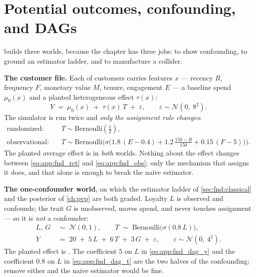 \section{Potential outcomes, confounding, and DAGs}
\label{app:dgp:fnd}

 builds three worlds, because the chapter has three jobs: to show confounding,
to ground an estimator ladder, and to manufacture a collider.

\textbf{The customer file.} Each of \nbZeroNCustomers{} customers carries features $x$ ---
recency $R$, frequency $F$, monetary value $M$, tenure, engagement $E$ --- a baseline spend
$\mu_0(x)$ and a planted heterogeneous effect $\tau(x)$:
%
\begin{equation}
  Y \;=\; \mu_0(x) \;+\; \tau(x)\,T \;+\; \varepsilon,
  \qquad \varepsilon \sim \mathcal N\!\left(0,\ 8^{2}\right).
  \label{eq:app:fnd_uplift}
\end{equation}
%
The simulator is run twice and \emph{only the assignment rule changes}:
%
\begin{align}
  \text{randomized:}\quad    & T \sim \text{Bernoulli}(\tfrac12), \label{eq:app:fnd_rct}\\
  \text{observational:}\quad & T \sim \text{Bernoulli}\Big(\sigma\big(1.8\,(E - 0.4)
     + 1.2\,\tfrac{150 - R}{150} + 0.15\,(F - 5)\big)\Big). \label{eq:app:fnd_obs}
\end{align}
%
The planted average effect is \eur{\nbZeroTrueAte} in \emph{both} worlds. Nothing about the effect
changes between \cref{eq:app:fnd_rct} and \cref{eq:app:fnd_obs}; only the mechanism that assigns it
does, and that alone is enough to break the naive estimator.

\textbf{The one-confounder world}, on which the estimator ladder of \cref{sec:fnd:classical} and
the posterior of \cref{ch:pvp} are both graded. Loyalty $L$ is observed and confounds; the trait
$G$ is unobserved, moves spend, and never touches assignment --- so it is \emph{not} a confounder:
%
\begin{align}
  L,\ G &\;\sim\; \mathcal N(0, 1), \qquad
  T \;\sim\; \text{Bernoulli}\big(\sigma(0.8\,L)\big), \label{eq:app:fnd_dag_t}\\
  Y &\;=\; 20 \;+\; 5\,L \;+\; 6\,T \;+\; 3\,G \;+\; \varepsilon,
       \qquad \varepsilon \sim \mathcal N\!\left(0,\ 4^{2}\right). \label{eq:app:fnd_dag_y}
\end{align}
%
The planted effect is \eur{\nbZeroTrueDag}. The coefficient $5$ on $L$ in
\cref{eq:app:fnd_dag_y} and the coefficient $0.8$ on $L$ in \cref{eq:app:fnd_dag_t} are the two
halves of the confounding; remove either and the naive estimator would be fine.

